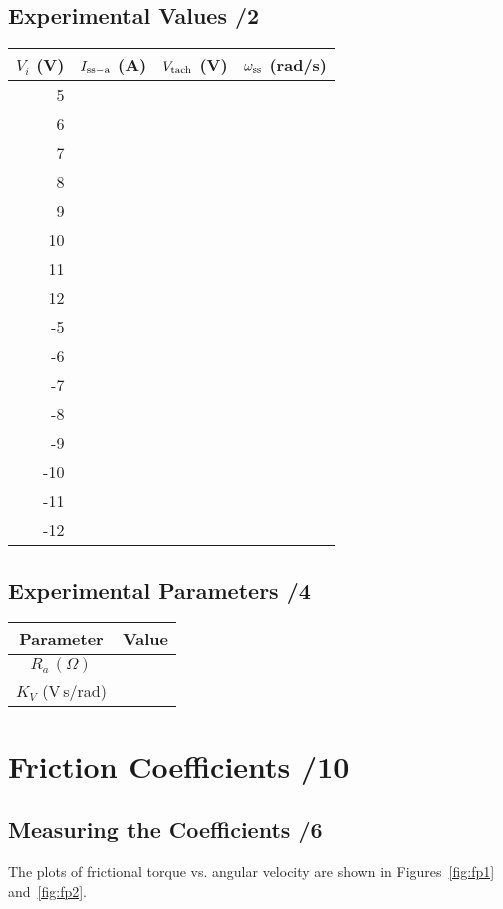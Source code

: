 \documentclass{article}
\newcommand{\score}{\hfill \underline{\hspace{1cm}}/}
\begin{document}
\subsection{Experimental Values \score 2}
\begin{center}
\begin{tabular}{rrrr}
$V_i$ (V) & $I_{\rm ss-a}$ (A) & $V_{\rm tach}$ (V) & $\omega_{\rm ss}$ (rad/s) \\
\hline
5 &   &   &   \\
6 &   &   &   \\
7 &   &   &  \\
8 &   &   &  \\
9 &   &   &  \\
10  &   &   & \\
11  &   &   &  \\
12  &   &   &  \\
-5  &  &  &  \\
-6  &  &  &  \\
-7  &  &  &   \\
-8  &  &  &   \\
-9  &  &  &   \\
-10 &  &  &   \\
-11 &  &  &   \\
-12 &  &  & 
\end{tabular}
\end{center}
\subsection{Experimental Parameters \score 4}
\begin{center}
\begin{tabular}{cc}
Parameter & Value \\
\hline
$R_a\,(\Omega)$ &   \\
$K_V$ (V\,s/rad) &  
\end{tabular}
\end{center}

\section{Friction Coefficients \score 10}
\subsection{Measuring the Coefficients \score 6}


The plots of frictional torque vs. angular velocity are shown in Figures~\ref{fig:fp1} and~\ref{fig:fp2}.
\end{document}
